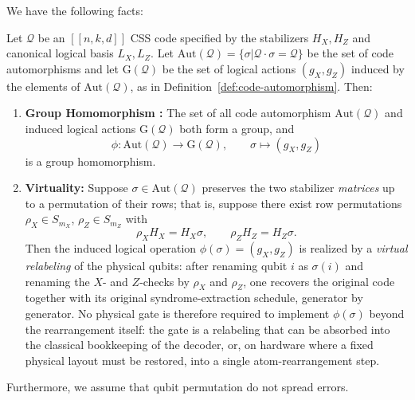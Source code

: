 We have the following facts:
\begin{fact}\label{fact:aut-facts}
Let $\mathcal{Q}$ be an $[[n,k,d]]$ CSS code specified by the stabilizers $H_X, H_Z$ and canonical logical basis $L_X, L_Z$. Let $\mathrm{Aut}(\mathcal{Q}) = \{\sigma | \mathcal{Q}\cdot \sigma = \mathcal{Q}\}$ be the set of code automorphisms and let $\mathrm{G}(\mathcal{Q})$ be the set of logical actions $(g_X,g_Z)$ induced by the elements of $\mathrm{Aut}(\mathcal Q)$, as in Definition~\ref{def:code-automorphism}. Then:

\begin{enumerate}
    \item \textbf{Group Homomorphism \cite{berthusen2025automorphismgadgetshomologicalproduct}:} The set of all code automorphism $\mathrm{Aut}(\mathcal{Q})$ and induced logical actions $\mathrm{G}(\mathcal{Q})$ both form a group, and
    \[
    \phi : \mathrm{Aut}(\mathcal{Q}) \to \mathrm{G}(\mathcal{Q}), \qquad \sigma \mapsto (g_X, g_Z)
    \]
    is a group homomorphism.
    \item \textbf{Virtuality:} Suppose $\sigma\in\mathrm{Aut}(\mathcal Q)$ preserves the two stabilizer \emph{matrices} up to a permutation of their rows; that is, suppose there exist row permutations $\rho_X\in S_{m_X}$, $\rho_Z\in S_{m_Z}$ with
    \[
    \rho_X H_X = H_X \sigma, \qquad \rho_Z H_Z = H_Z \sigma.
    \]
    Then the induced logical operation $\phi(\sigma) = (g_X,g_Z)$ is realized by a \emph{virtual relabeling} of the physical qubits: after renaming qubit $i$ as $\sigma(i)$ and renaming the $X$- and $Z$-checks by $\rho_X$ and $\rho_Z$, one recovers the original code together with its original syndrome-extraction schedule, generator by generator. No physical gate is therefore required to implement $\phi(\sigma)$ beyond the rearrangement itself: the gate is a relabeling that can be absorbed into the classical bookkeeping of the decoder, or, on hardware where a fixed physical layout must be restored, into a single atom-rearrangement step.
\end{enumerate}
\end{fact}

Furthermore, we assume that qubit permutation do not spread errors.


